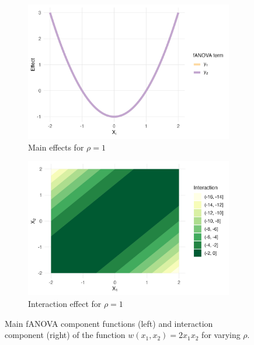 \begin{figure}[htpb]
    \vspace{0.5em}
    \begin{subfigure}[t]{0.49\textwidth}
        \centering
        \includegraphics[width=\textwidth]{images/experiment_section/interaction_a1p00_a2p00_a11p00_a22p00_a12p20_rhop10_main.png}
        \caption{Main effects for $\rho = 1$}
    \end{subfigure}%
    \hfill
    \begin{subfigure}[t]{0.49\textwidth}
        \centering
        \includegraphics[width=\textwidth]{images/experiment_section/interaction_a1p00_a2p00_a11p00_a22p00_a12p20_rhop10_interaction.png}
        \caption{Interaction effect for $\rho = 1$}
    \end{subfigure}

    \caption{Main fANOVA component functions (left) and interaction component (right) of the function $w(x_1, x_2) = 2x_1x_2$ for varying $\rho$.}
    \label{fig:interaction_combined}
\end{figure}


